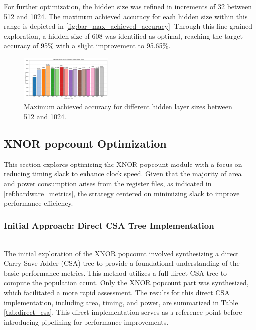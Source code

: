 \documentclass[conference]{IEEEtran}
\begin{document}
For further optimization, the hidden size was refined in increments of 32 between 512 and 1024. The maximum achieved accuracy for each hidden size within this range is depicted in \autoref{fig:bar_max_achieved_accuracy}. Through this fine-grained exploration, a hidden size of 608 was identified as optimal, reaching the target accuracy of 95\% with a slight improvement to 95.65\%.

\begin{figure}[h]
    \centering
    \includegraphics[width=0.4\textwidth]{Different_hidden_layer_sizes_512_1024.png}
    \caption{Maximum achieved accuracy for different hidden layer sizes between 512 and 1024.}
    \label{fig:bar_max_achieved_accuracy}
\end{figure}


\subsection{XNOR popcount Optimization}
\label{ref:xnor_popcount}

This section explores optimizing the XNOR popcount module with a focus on reducing timing slack to enhance clock speed. Given that the majority of area and power consumption arises from the register files, as indicated in \ref{ref:hardware_metrics}, the strategy centered on minimizing slack to improve performance efficiency.

\subsubsection{Initial Approach: Direct CSA Tree Implementation}
\hfill\\

The initial exploration of the XNOR popcount involved synthesizing a direct Carry-Save Adder (CSA) tree to provide a foundational understanding of the basic performance metrics. This method utilizes a full direct CSA tree to compute the population count. Only the XNOR popcount part was synthesized, which facilitated a more rapid assessment. The results for this direct CSA implementation, including area, timing, and power, are summarized in Table \ref{tab:direct_csa}. This direct implementation serves as a reference point before introducing pipelining for performance improvements.
\end{document}
